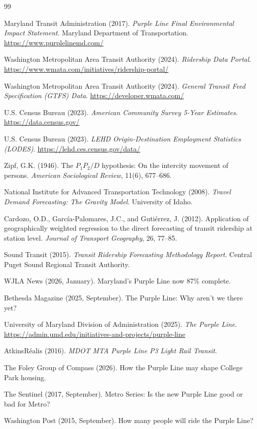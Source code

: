 \documentclass[11pt]{article}
\begin{document}
\begin{thebibliography}{99}

Maryland Transit Administration (2017).
\textit{Purple Line Final Environmental Impact Statement}.
Maryland Department of Transportation.
\url{https://www.purplelinemd.com/}

Washington Metropolitan Area Transit Authority (2024).
\textit{Ridership Data Portal}.
\url{https://www.wmata.com/initiatives/ridership-portal/}

Washington Metropolitan Area Transit Authority (2024).
\textit{General Transit Feed Specification (GTFS) Data}.
\url{https://developer.wmata.com/}

U.S. Census Bureau (2023).
\textit{American Community Survey 5-Year Estimates}.
\url{https://data.census.gov/}

U.S. Census Bureau (2023).
\textit{LEHD Origin-Destination Employment Statistics (LODES)}.
\url{https://lehd.ces.census.gov/data/}

Zipf, G.K. (1946).
The $P_1 P_2 / D$ hypothesis: On the intercity movement of persons.
\textit{American Sociological Review}, 11(6), 677--686.

National Institute for Advanced Transportation Technology (2008).
\textit{Travel Demand Forecasting: The Gravity Model}.
University of Idaho.

Cardozo, O.D., Garc\'{i}a-Palomares, J.C., and Guti\'{e}rrez, J. (2012).
Application of geographically weighted regression to the direct forecasting
of transit ridership at station level.
\textit{Journal of Transport Geography}, 26, 77--85.

Sound Transit (2015).
\textit{Transit Ridership Forecasting Methodology Report}.
Central Puget Sound Regional Transit Authority.

WJLA News (2026, January).
Maryland's Purple Line now 87\% complete.

Bethesda Magazine (2025, September).
The Purple Line: Why aren't we there yet?

University of Maryland Division of Administration (2025).
\textit{The Purple Line}.
\url{https://admin.umd.edu/initiatives-and-projects/purple-line}

AtkinsR\'{e}alis (2016).
\textit{MDOT MTA Purple Line P3 Light Rail Transit}.

The Foley Group of Compass (2026).
How the Purple Line may shape College Park housing.

The Sentinel (2017, September).
Metro Series: Is the new Purple Line good or bad for Metro?

Washington Post (2015, September).
How many people will ride the Purple Line?

\end{thebibliography}
\end{document}
